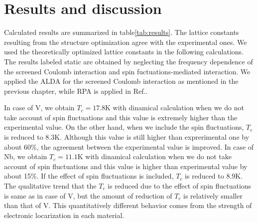 \section{Results and discussion}
Calculated results are summarized in table\ref{tab:results}.
The lattice constants resulting from the structure optimization agree with the experimental ones.
We used the theoretically optimized lattice constants in the following calculations.
The results labeled static are obtained by neglecting the frequency dependence of the 
screened Coulomb interaction and spin fuctuations-mediated interaction.
We applied the ALDA for the screened Coulomb interaction as mentioned in the previous chapter, 
while RPA is applied in Ref.\cite{RA2013}.

In case of V, we obtain $T_c = 17.8$K with dinamical calculation when we do not take account of 
spin fluctuations and this value is extremely higher than the experimental value.
On the other hand, when we include the spin fluctuations, $T_c$ is reduced to $8.3$K.
Although this value is still higher than exprerimental one by about 60\%, the agreement between 
the experimental value is improved.
In case of Nb, we obtain $T_c = 11.1$K with dinamical calculation when we do not take account of 
spin fluctuations and this value is higher than experimental value by about 15\%.
If the effect of spin fluctuations is included, $T_c$ is reduced to $8.9$K.
The qualitative trend that the $T_c$ is reduced due to the effect of spin fluctuations is same as 
in case of V, but the amount of reduction of $T_c$ is relatively smaller than that of V.
This quantitatively different behavior comes from the strength of electronic locarization in each material.

